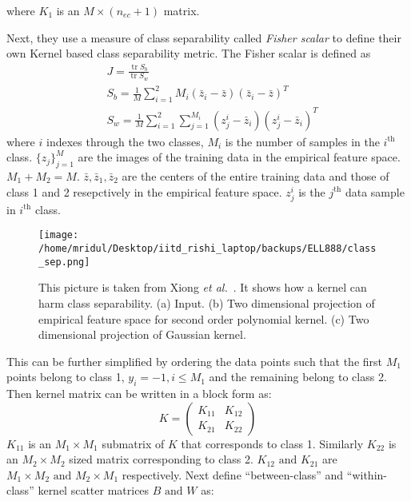 \documentclass[11pt]{article}
\begin{document}
where $K_1$ is an $M\times(n_{ec}+1)$ matrix.\par
Next, they use a measure of class separability called {\em Fisher scalar} to
define their own Kernel based class separability metric. The Fisher scalar is
defined as
\begin{align}
    &J=\frac{\operatorname{tr} S_b}{\operatorname{tr} S_w}\\
    &S_b=\frac{1}{M}\sum_{i=1}^2M_i(\bar{z}_i-\bar{z})(\bar{z}_i-\bar{z})^T\\
    &S_w=\frac{1}{M}\sum_{i=1}^2\sum_{j=1}^{M_i}(z_j^i-\bar{z}_i)(z_j^i-\bar{z}_i)^T
\end{align}
where $i$ indexes through the two classes, $M_i$ is the number of samples in the
$i^\text{th}$ class. $\{z_j\}_{j=1}^M$ are the images of the training data in
the empirical feature space. $M_1+M_2=M$. $\bar{z},\bar{z}_1,\bar{z}_2$ are the
centers of the entire training data and those of class 1 and 2 resepctively in
the empirical feature space. $z_j^i$ is the $j^\text{th}$ data sample in
$i^\text{th}$ class.
\begin{figure}[!htbp]
    \centering
    \texttt{[image: /home/mridul/Desktop/iitd\_rishi\_laptop/backups/ELL888/class\_sep.png]}
    \caption{\label{fig:6}This picture is taken from Xiong {\em et
    al.}~\cite{xiong}.  It shows how a kernel can harm class separability. (a)
    Input. (b) Two dimensional projection of empirical feature space for second
    order polynomial kernel. (c) Two dimensional projection of Gaussian kernel.}
\end{figure}
\par
This can be further simplified by ordering the data points such that the first
$M_1$ points belong to class 1, $y_i=-1,i\le M_1$ and the remaining belong to
class 2. Then kernel matrix can be written in a block form as:
\[K=\begin{pmatrix}K_{11}&K_{12}\\K_{21}&K_{22}\end{pmatrix}\]
$K_{11}$ is an $M_1\times M_1$ submatrix of $K$ that corresponds to class 1.
Similarly $K_{22}$ is an $M_2\times M_2$ sized matrix corresponding to class 2.
$K_{12}\text{ and }K_{21}$ are $M_1\times M_2\text{ and }M_2\times M_1$
respectively. Next define ``between-class'' and ``within-class'' kernel scatter
matrices $B\text{ and }W$ as:
\end{document}
